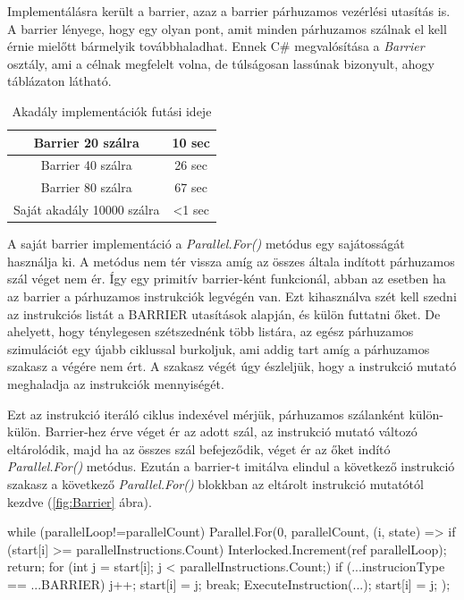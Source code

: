 Implementálásra került a barrier, azaz a barrier párhuzamos vezérlési utasítás is. A barrier lényege,  hogy egy olyan pont, amit minden párhuzamos szálnak el kell érnie mielőtt bármelyik továbbhaladhat. Ennek C\# megvalósítása a \textit{Barrier} osztály, ami a célnak megfelelt volna, de túlságosan lassúnak bizonyult, ahogy  táblázaton látható.



\begin{table}[h]
\centering
\caption{Akadály implementációk futási ideje}
\label{tab:barrier}
\begin{tabular}{|c|c|}
\hline
Barrier 20 szálra & 10 sec  \\
\hline
Barrier 40 szálra & 26 sec \\
\hline
Barrier 80 szálra & 67 sec \\
\hline 
Saját akadály 10000 szálra & <1 sec \\
\hline
\end{tabular}
\end{table}

A saját barrier implementáció a \textit{Parallel.For()} metódus egy sajátosságát használja ki. A metódus nem tér vissza amíg az összes általa indított párhuzamos szál véget nem ér. Így egy primitív barrier-ként funkcionál, abban az esetben ha az barrier a párhuzamos instrukciók legvégén van. Ezt kihasználva szét kell szedni az instrukciós listát a BARRIER utasítások alapján, és külön futtatni őket. De ahelyett, hogy ténylegesen szétszednénk több listára, az egész párhuzamos szimulációt egy újabb ciklussal burkoljuk, ami addig tart amíg a párhuzamos szakasz a végére nem ért. A szakasz végét úgy észleljük, hogy a instrukció mutató meghaladja az instrukciók mennyiségét. 

Ezt az instrukció iteráló ciklus indexével mérjük, párhuzamos szálanként külön-külön. Barrier-hez érve véget ér az adott szál, az instrukció mutató változó eltárolódik, majd ha az összes szál befejeződik, véget ér az őket indító \textit{Parallel.For()} metódus. Ezután a barrier-t imitálva elindul a következő instrukció szakasz a következő \textit{Parallel.For()} blokkban az eltárolt instrukció mutatótól kezdve (\ref{fig:Barrier} ábra). 



\begin{cpp}
while (parallelLoop!=parallelCount)
    {
        Parallel.For(0, parallelCount, (i, state) =>
        {
            if (start[i] >= parallelInstructions.Count)
            {
                Interlocked.Increment(ref parallelLoop);
                return;
            } 
            for (int j = start[i]; j < parallelInstructions.Count;)
            {
                if (...instrucionType == ...BARRIER)
                   {
                       j++;
                       start[i] = j;
                       break;
                   }
                ExecuteInstruction(...);
                start[i] = j;
            }
        });
    }
\end{cpp}

